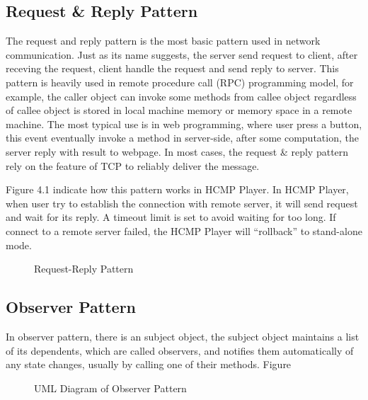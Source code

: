 \subsection{Request \& Reply Pattern}
The request and reply pattern is the most basic pattern used in network 
communication. Just as its name suggests, the server send request to client, 
after receving the request, client handle the request and send reply to 
server. This pattern is heavily used in remote procedure call (RPC) programming 
model, for example, the caller object can invoke some methods from callee 
object regardless of callee object is stored in local machine memory or
memory space in a remote machine. The most typical use is in web programming, 
where user press a button, this event eventually invoke a method in server-side, 
after some computation, the server reply with result to webpage. In most cases, 
the request \& reply pattern
rely on the feature of TCP to reliably deliver the message. 

Figure 4.1 indicate how this pattern works in HCMP Player. In HCMP Player, 
when user try to establish the connection with remote  
server, it will send request and wait for its reply. A timeout limit is set to 
avoid waiting for too long. If connect to a remote server failed, the HCMP Player
will ``rollback'' to stand-alone mode.
\begin{figure}[H]
\caption{Request-Reply Pattern}
\label{fig:speciation}
\end{figure}

\subsection{Observer Pattern}
In observer pattern, there is an subject object, the subject object  maintains 
a list of its dependents, which are called observers, and notifies them 
automatically of any state changes, usually by calling one of their methods. Figure
\begin{figure}[H]
\caption{UML Diagram of Observer Pattern}
\label{fig:speciation}
\end{figure}

